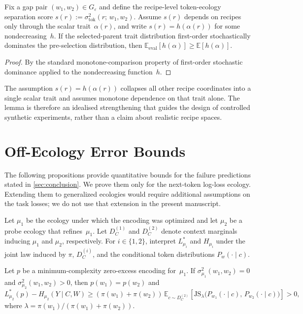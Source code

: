 \documentclass[twoside,11pt]{article}
\newcommand{\sigmasq}{\sigma^2}
\newcommand{\E}{\mathbb{E}}
\newcommand{\JS}{\mathrm{JS}}
\begin{document}
\begin{lemma}\label{lem:gap-closing}
Fix a gap pair $(w_1,w_2)\in G_\varepsilon$ and define the recipe-level token-ecology separation score $s(r):=\sigmasq_{\mathrm{tok}}(r;\,w_1,w_2)$. Assume $s(r)$ depends on recipes only through the scalar trait~$\alpha(r)$, and write $s(r)=h(\alpha(r))$ for some nondecreasing~$h$. If the selected-parent trait distribution first-order stochastically dominates the pre-selection distribution, then $\E_{\mathrm{eval}}[h(\alpha)]\ge\E[h(\alpha)]$.
\end{lemma}

\begin{proof}
By the standard monotone-comparison property of first-order stochastic dominance applied to the nondecreasing function~$h$.
\end{proof}

The assumption $s(r)=h(\alpha(r))$ collapses all other recipe coordinates into a single scalar trait and assumes monotone dependence on that trait alone. The lemma is therefore an idealised strengthening that guides the design of controlled synthetic experiments, rather than a claim about realistic recipe spaces.

\section{Off-Ecology Error Bounds}\label{app:off-ecology}

The following propositions provide quantitative bounds for the failure predictions stated in \cref{sec:conclusion}. We prove them only for the next-token log-loss ecology. Extending them to generalized ecologies would require additional assumptions on the task losses; we do not use that extension in the present manuscript.

Let $\mu_1$ be the ecology under which the encoding was optimized and let $\mu_2$ be a probe ecology that refines~$\mu_1$. Let $D_C^{(1)}$ and $D_C^{(2)}$ denote context marginals inducing $\mu_1$ and $\mu_2$, respectively. For $i\in\{1,2\}$, interpret $L_{\mu_i}^*$ and $H_{\mu_i}$ under the joint law induced by $\pi$, $D_C^{(i)}$, and the conditional token distributions $P_w(\cdot\mid c)$.

\begin{proposition}\label{prop:off-ecology-error}
Let $p$ be a minimum-complexity zero-excess encoding for~$\mu_1$. If $\sigmasq_{\mu_1}(w_1,w_2)=0$ and $\sigmasq_{\mu_2}(w_1,w_2)>0$, then $p(w_1)=p(w_2)$ and
\[
L_{\mu_2}^*(p) - H_{\mu_2}(Y \mid C,W)
\ge (\pi(w_1)+\pi(w_2))\,
   \E_{c\sim D_C^{(2)}}
   \!\left[\JS_{\lambda}
   \bigl(P_{w_1}(\cdot\mid c),\,P_{w_2}(\cdot\mid c)\bigr)\right]
> 0,
\]
where $\lambda=\pi(w_1)/(\pi(w_1)+\pi(w_2))$.
\end{proposition}
\end{document}
